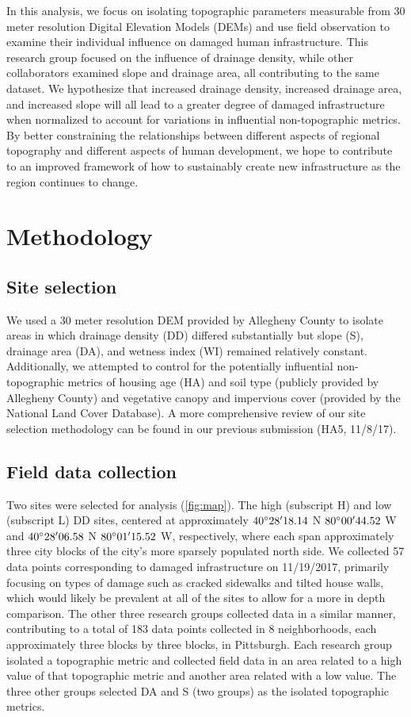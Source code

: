 \documentclass[final,12pt,times,twocolumn,authoryear]{elsarticle}
\begin{document}
In this analysis, we focus on isolating topographic parameters measurable from 30 meter resolution Digital Elevation Models (DEMs) and use field observation to examine their individual influence on damaged human infrastructure. This research group focused on the influence of drainage density, while other collaborators examined slope and drainage area, all contributing to the same dataset. We hypothesize that increased drainage density, increased drainage area, and increased slope will all lead to a greater degree of damaged infrastructure when normalized to account for variations in influential non-topographic metrics. By better constraining the relationships between different aspects of regional topography and different aspects of human development, we hope to contribute to an improved framework of how to sustainably create new infrastructure as the region continues to change. 


\section{Methodology}
\label{s:methods}

\subsection{Site selection}
We used a 30 meter resolution DEM provided by Allegheny County to isolate areas in which drainage density (DD) differed substantially but slope (S), drainage area (DA), and wetness index (WI) remained relatively constant. Additionally, we attempted to control for the potentially influential non-topographic metrics of housing age (HA) and soil type (publicly provided by Allegheny County) and vegetative canopy and impervious cover (provided by the National Land Cover Database). A more comprehensive review of our site selection methodology can be found in our previous submission (HA5, 11/8/17). 

\subsection{Field data collection}
Two sites were selected for analysis (\autoref{fig:map}). The high (subscript H) and low (subscript L) DD sites, centered at approximately $40\degree28'18.14$ N $80\degree00'44.52$ W and $40\degree28'06.58$ N $80\degree01'15.52$ W, respectively, where each span approximately three city blocks of the city’s more sparsely populated north side. We collected 57 data points corresponding to damaged infrastructure on 11/19/2017, primarily focusing on types of damage such as cracked sidewalks and tilted house walls, which would likely be prevalent at all of the sites to allow for a more in depth comparison. The other three research groups collected data in a similar manner, contributing to a total of 183 data points collected in 8 neighborhoods, each approximately three blocks by three blocks, in Pittsburgh. Each research group isolated a topographic metric and collected field data in an area related to a high value of that topographic metric and another area related with a low value. The three other groups selected DA and S (two groups) as the isolated topographic metrics.
\end{document}
